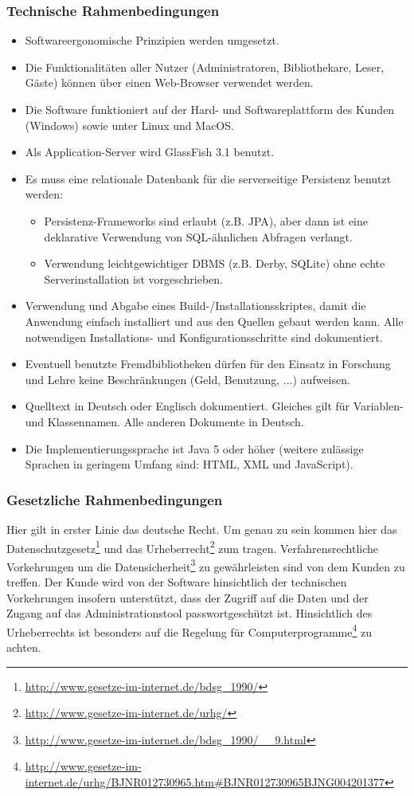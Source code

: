 \documentclass[fontsize=12pt,paper=a4,twoside]{scrartcl}
\begin{document}
\subsubsection{Technische Rahmenbedingungen} \label{subsubsec:TechRahmen} 
\begin{itemize}
	\item Softwareergonomische Prinzipien werden umgesetzt. 
	\item Die Funktionalitäten aller Nutzer (Administratoren, Bibliothekare, Leser, Gäste) können über einen Web-Browser verwendet werden. 
	\item Die Software funktioniert auf der Hard- und Softwareplattform des Kunden (Windows) sowie unter Linux und MacOS. 
	\item Als Application-Server wird GlassFish 3.1 benutzt. 
	\item Es muss eine relationale Datenbank für die serverseitige Persistenz benutzt werden: 
	\begin{itemize}
		\item Persistenz-Frameworks sind erlaubt (z.B. JPA), aber dann ist eine deklarative Verwendung von SQL-ähnlichen Abfragen verlangt. 
		\item Verwendung leichtgewichtiger DBMS (z.B. Derby, SQLite) ohne echte Serverinstallation ist vorgeschrieben. 
	\end{itemize}
	\item Verwendung und Abgabe eines Build-/Installationsskriptes, damit die Anwendung einfach installiert und aus den Quellen gebaut werden kann. Alle notwendigen Installations- und Konfigurationsschritte sind dokumentiert. 
	\item Eventuell benutzte Fremdbibliotheken dürfen für den Einsatz in Forschung und Lehre keine Beschränkungen (Geld, Benutzung, ...) aufweisen. 
	\item Quelltext in Deutsch oder Englisch dokumentiert. Gleiches gilt für Variablen- und Klassennamen. Alle anderen Dokumente in Deutsch. 
	\item Die Implementierungssprache ist Java 5 oder höher (weitere zulässige Sprachen in geringem Umfang sind: HTML, XML und JavaScript). 
\end{itemize}

\subsubsection{Gesetzliche Rahmenbedingungen} \label{subsubsec:GesetzlRahmen} Hier gilt in erster Linie das deutsche Recht. Um genau zu sein kommen hier das Datenschutzgesetz\footnote{\url{http://www.gesetze-im-internet.de/bdsg_1990/}} und das Urheberrecht\footnote{\url{http://www.gesetze-im-internet.de/urhg/}} zum tragen. Verfahrensrechtliche Vorkehrungen um die Datensicherheit\footnote{\url{http://www.gesetze-im-internet.de/bdsg_1990/__9.html}} zu gewährleisten sind von dem Kunden zu treffen. Der Kunde wird von der Software hinsichtlich der technischen Vorkehrungen insofern unterstützt, dass der Zugriff auf die Daten und der Zugang auf das Administrationstool passwortgeschützt ist. Hinsichtlich des Urheberrechts ist besonders auf die Regelung für Computerprogramme\footnote{\url{http://www.gesetze-im-internet.de/urhg/BJNR012730965.htm\#BJNR012730965BJNG004201377}} zu achten.
\end{document}
